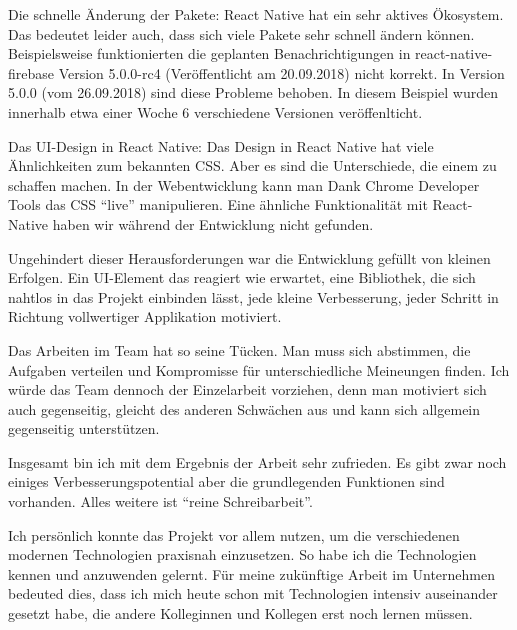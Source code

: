 Die schnelle Änderung der Pakete:
React Native hat ein sehr aktives Ökosystem.
Das bedeutet leider auch,
dass sich viele Pakete sehr schnell ändern können.
Beispielsweise funktionierten die geplanten Benachrichtigungen in react-native-firebase Version 5.0.0-rc4 (Veröffentlicht am 20.09.2018) nicht korrekt.
In Version 5.0.0 (vom 26.09.2018) sind diese Probleme behoben. In diesem Beispiel wurden innerhalb etwa einer Woche 6 verschiedene Versionen veröffenlticht.

Das UI-Design in React Native:
Das Design in React Native hat viele Ähnlichkeiten zum bekannten CSS.
Aber es sind die Unterschiede, die einem zu schaffen machen.
In der Webentwicklung kann man Dank Chrome Developer Tools das CSS \enquote{live} manipulieren.
Eine ähnliche Funktionalität mit React-Native haben wir während der Entwicklung nicht gefunden.

Ungehindert dieser Herausforderungen war die Entwicklung gefüllt von kleinen Erfolgen.
Ein UI-Element das reagiert wie erwartet,
eine Bibliothek, die sich nahtlos in das Projekt einbinden lässt,
jede kleine Verbesserung, jeder Schritt in Richtung vollwertiger Applikation motiviert.

Das Arbeiten im Team hat so seine Tücken.
Man muss sich abstimmen, die Aufgaben verteilen und Kompromisse für unterschiedliche Meineungen finden.
Ich würde das Team dennoch der Einzelarbeit vorziehen, denn man motiviert sich auch gegenseitig,
gleicht des anderen Schwächen aus und kann sich allgemein gegenseitig unterstützen.

Insgesamt bin ich mit dem Ergebnis der Arbeit sehr zufrieden.
Es gibt zwar noch einiges Verbesserungspotential aber die grundlegenden Funktionen sind vorhanden.
Alles weitere ist \enquote{reine Schreibarbeit}.

Ich persönlich konnte das Projekt vor allem nutzen, um die verschiedenen modernen Technologien praxisnah einzusetzen.
So habe ich die Technologien kennen und anzuwenden gelernt.
Für meine zukünftige Arbeit im Unternehmen bedeuted dies,
dass ich mich heute schon mit Technologien intensiv auseinander gesetzt habe,
die andere Kolleginnen und Kollegen erst noch lernen müssen.